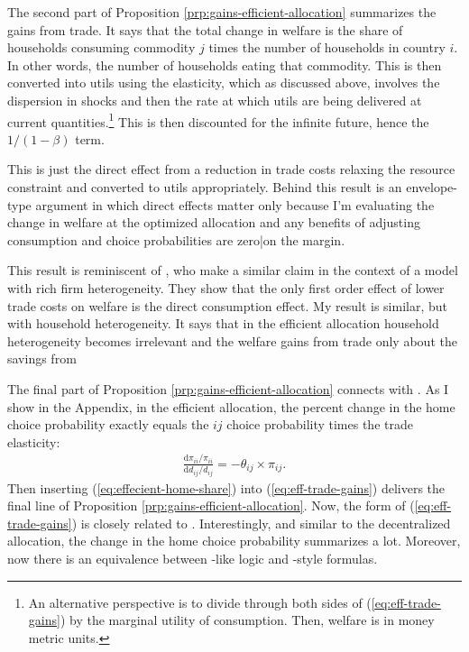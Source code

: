 \documentclass[12pt,pdftex]{article}
\begin{document}
\begin{onehalfspacing}
The second part of Proposition \ref{prp:gains-efficient-allocation} summarizes the gains from trade. It says that the total change in welfare is the share of households consuming commodity $j$ times the number of households in country $i$. In other words, the number of households eating that commodity. This is then converted into utils using the elasticity, which as discussed above, involves the dispersion in shocks and then the rate at which utils are being delivered at current quantities.\footnote{An alternative perspective is to divide through both sides of (\ref{eq:eff-trade-gains}) by the marginal utility of consumption. Then, welfare is in money metric units.} This is then discounted for the infinite future, hence the $1/ (1-\beta)$ term.

This is just the direct effect from a reduction in trade costs relaxing the resource constraint and converted to utils appropriately. Behind this result is an envelope-type argument in which direct effects matter only because I'm evaluating the change in welfare at the optimized allocation and any benefits of adjusting consumption and choice probabilities are zero|on the margin.

This result is reminiscent of \citet{AtkesonBurstein2010}, who make a similar claim in the context of a model with rich firm heterogeneity. They show that the only first order effect of lower trade costs on welfare is the direct consumption effect. My result is similar, but with household heterogeneity. It says that in the efficient allocation household heterogeneity becomes irrelevant and the welfare gains from trade only about the savings from

The final part of Proposition \ref{prp:gains-efficient-allocation} connects with \citet{arkolakis2012new}. As I show in the Appendix, in the efficient allocation, the percent change in the home choice probability exactly equals the $ij$ choice probability times the trade elasticity:
\begin{align}
\frac{\mathrm{d} \pi_{ii} / \pi_{ii}}{\mathrm{d} d_{ij} / d_{ij}} = -\theta_{ij} \times \pi_{ij}.
\label{eq:effecient-home-share}
\end{align}
Then inserting (\ref{eq:effecient-home-share}) into  (\ref{eq:eff-trade-gains}) delivers the final line of Proposition \ref{prp:gains-efficient-allocation}. Now, the form of (\ref{eq:eff-trade-gains}) is closely related to \citet{arkolakis2012new}. Interestingly, and similar to the decentralized allocation, the change in the home choice probability summarizes a lot. Moreover, now there is an equivalence between \citet{AtkesonBurstein2010}-like logic and \citet{arkolakis2012new}-style formulas.


\end{onehalfspacing}
\end{document}
